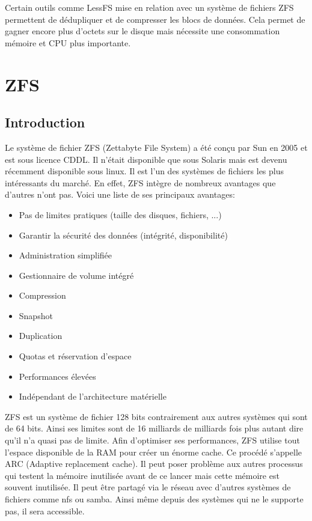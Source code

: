 \documentclass[a4paper]{report}
\begin{document}
Certain outils comme LessFS mise en relation avec un système de fichiers ZFS permettent de dédupliquer et de compresser les blocs de données. Cela permet de gagner encore plus d'octets sur le disque mais nécessite une consommation mémoire et CPU plus importante.

	\chapter*{ZFS}
	\section{Introduction}
	Le système de fichier ZFS (Zettabyte File System) a été conçu par Sun en 2005 et est sous licence CDDL.  Il n'était disponible que sous Solaris mais est devenu récemment disponible sous linux. Il est l'un des systèmes de fichiers les plus intéressants du marché. En effet, ZFS intègre de nombreux avantages que d'autres n'ont pas. Voici une liste de ses principaux avantages: \\
	\begin{itemize}
		 \item Pas de limites pratiques (taille des disques, fichiers, ...)
		 \item Garantir la sécurité des données (intégrité, disponibilité)
		 \item Administration simplifiée
		 \item Gestionnaire de volume intégré
		 \item Compression
		 \item Snapshot
		 \item Duplication
		 \item Quotas et réservation d’espace
		 \item Performances élevées
		 \item Indépendant de l’architecture matérielle\\
	\end{itemize}
	ZFS est un système de fichier 128 bits contrairement aux autres systèmes qui sont de 64 bits. Ainsi ses limites sont de 16 milliards de milliards fois plus autant dire qu'il n'a quasi pas de limite. Afin d'optimiser ses performances, ZFS utilise tout l'espace disponible de la RAM pour créer un énorme cache. Ce procédé s'appelle ARC (Adaptive replacement cache). Il peut poser problème aux autres processus qui testent la mémoire inutilisée avant de ce lancer mais cette mémoire est souvent inutilisée. Il peut être partagé via le réseau avec d'autres systèmes de fichiers comme nfs ou samba. Ainsi même depuis des systèmes qui ne le supporte pas, il sera accessible.\\
\end{document}
